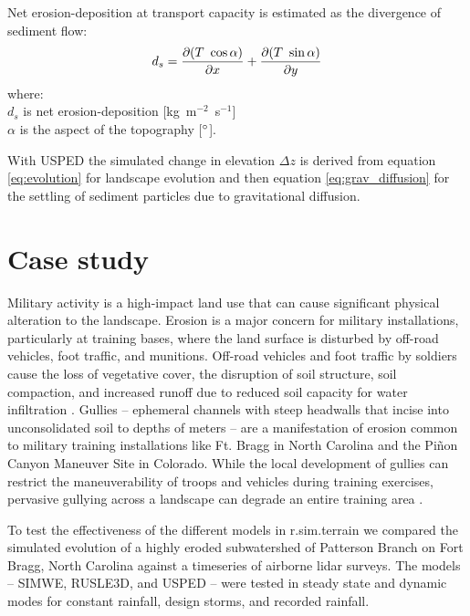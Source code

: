 \documentclass[gmd, manuscript]{copernicus}
\begin{document}
\noindent
Net erosion-deposition at transport capacity is estimated as the divergence of sediment flow: 
\begin{equation}\label{eq:usped_erdep} 
d_s = 
{\partial (T ~ \cos \alpha) \over \partial x} +
{\partial (T ~ \sin \alpha) \over \partial y}
\end{equation}
{\small
\noindent
where: \\
\hspace*{0.5em} $d_s$ is net erosion-deposition [\unit{kg~m}$^{-2}$~\unit{s}$^{-1}$]\\
\hspace*{0.5em} $\alpha$ is the aspect of the topography [$^{\circ}$].\\
}


\noindent
With USPED the simulated change in elevation $\Delta z$
is derived from equation \ref{eq:evolution} for landscape evolution
and then equation \ref{eq:grav_diffusion}
for the settling of sediment particles due to gravitational diffusion.


\section{Case study} 

Military activity is a high-impact land use 
that can cause significant physical alteration to the landscape. 
Erosion is a major concern for military installations, 
particularly at training bases, 
where the land surface is disturbed by 
off-road vehicles, foot traffic, and munitions. 
Off-road vehicles and foot traffic by soldiers 
cause the loss of vegetative cover, 
the disruption of soil structure, soil compaction, 
and increased runoff due to 
reduced soil capacity for water infiltration 
\citep{Webb1983, McDonald2004}.
Gullies -- ephemeral channels with steep headwalls 
that incise into unconsolidated soil to depths of meters -- 
are a manifestation of erosion common to 
military training installations like Ft. Bragg in North Carolina 
and the Piñon Canyon Maneuver Site in Colorado. 
While the local development of gullies can restrict 
the maneuverability of troops and vehicles during training exercises, 
pervasive gullying across a landscape 
can degrade an entire training area 
\citep{Huang2014}.

To test the effectiveness of the different models 
in r.sim.terrain
we compared the simulated evolution
of a highly eroded subwatershed of 
Patterson Branch on Fort Bragg, North Carolina
against a timeseries of airborne lidar surveys.
The models -- SIMWE, RUSLE3D, and USPED --
were tested in steady state and dynamic modes
for constant rainfall, design storms, and recorded rainfall.
\end{document}

